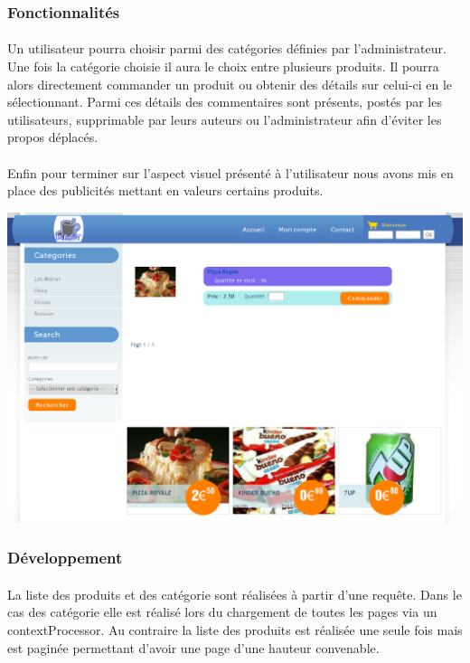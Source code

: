 \documentclass[twoside,UTF8]{EPURapport}
\begin{document}
            \subsubsection{Fonctionnalités}

                \paragraph{}Un utilisateur pourra choisir parmi des catégories définies par l'administrateur. Une fois la catégorie choisie il aura le choix entre plusieurs produits. Il pourra alors directement commander un produit ou obtenir des détails sur celui-ci en le sélectionnant. Parmi ces détails des commentaires sont présents, postés par les utilisateurs, supprimable par leurs auteurs ou l'administrateur afin d'éviter les propos déplacés.

                \paragraph{}Enfin pour terminer sur l'aspect visuel présenté à l'utilisateur nous avons mis en place des publicités mettant en valeurs certains produits.            

                \begin{center}
                    \includegraphics[width=0.8\linewidth]{logos/commande.png}
                \end{center}

            \subsubsection{Développement}

                \paragraph{}La liste des produits et des catégorie sont réalisées à partir d'une requête. Dans le cas des catégorie elle est réalisé lors du chargement de toutes les pages via un contextProcessor. Au contraire la liste des produits est réalisée une seule fois mais est paginée permettant d'avoir une page d'une hauteur convenable.
\end{document}

